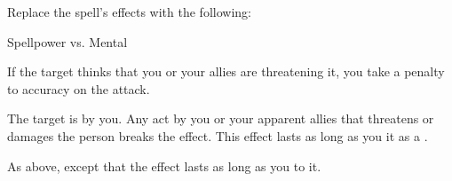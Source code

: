 Replace the spell's effects with the following:
\begin{spellcontent}

\begin{augmenteffects}




\begin{spellattack}{Spellpower vs. Mental}


\spellspecial If the target thinks that you or your allies are threatening it, you take a  penalty to accuracy on the attack.


\spellsuccess
The target is \charmed by you.
Any act by you or your apparent allies that threatens or damages the  person breaks the effect.
This effect lasts as long as you  it as a .



\spellcritical
As above, except that the effect lasts as long as you  to it.



\end{spellattack}





\end{augmenteffects}

\end{spellcontent}








